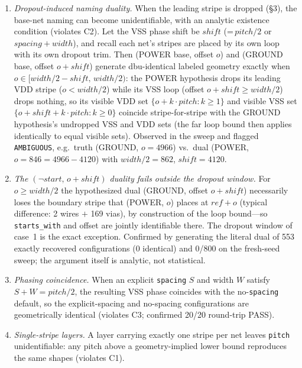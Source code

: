 \documentclass[11pt]{article}
\begin{document}
\begin{enumerate}
\item \emph{Dropout-induced naming duality.} When the leading stripe is
dropped (\S3), the base-net naming can become unidentifiable, with an
analytic existence condition (violates C2).  Let the VSS phase shift be
$\mathit{shift}$ (=\,$\mathit{pitch}/2$ or $\mathit{spacing} +
\mathit{width}$), and recall each net's stripes are placed by its own
loop with its own dropout trim.  Then (POWER base, offset $o$) and
(GROUND base, offset $o + \mathit{shift}$) generate dbu-identical
labeled geometry exactly when $o \in [\mathit{width}/2 -
\mathit{shift},\, \mathit{width}/2)$: the POWER hypothesis drops its
leading VDD stripe ($o < \mathit{width}/2$) while its VSS loop (offset
$o + \mathit{shift} \geq \mathit{width}/2$) drops nothing, so its
visible VDD set $\{o + k\cdot\mathit{pitch} : k \geq 1\}$ and visible
VSS set $\{o + \mathit{shift} + k\cdot\mathit{pitch} : k \geq 0\}$
coincide stripe-for-stripe with the GROUND hypothesis's undropped VSS
and VDD sets (the far loop bound then applies identically to equal
visible sets).  Observed in the sweep and flagged \texttt{AMBIGUOUS},
e.g.\ truth (GROUND, $o{=}4966$) vs.\ dual (POWER, $o{=}846 = 4966 -
4120$) with $\mathit{width}/2{=}862$, $\mathit{shift}{=}4120$.
\item \emph{The $(\neg\mathit{start},\,o+\mathit{shift})$ duality fails
outside the dropout window.} For $o \geq \mathit{width}/2$ the
hypothesized dual (GROUND, offset $o+\mathit{shift}$) necessarily loses
the boundary stripe that (POWER, $o$) places at $\mathit{ref}+o$
(typical difference: 2 wires $+$ 169 vias), by construction of the loop
bound---so \texttt{starts\_with} and offset are jointly identifiable
there.  The dropout window of case~1 is the exact exception.  Confirmed
by generating the literal dual of 553 exactly recovered configurations
(0 identical) and 0/800 on the fresh-seed sweep; the argument itself is
analytic, not statistical.
\item \emph{Phasing coincidence.} When an explicit \texttt{spacing} $S$
and width $W$ satisfy $S + W = \mathit{pitch}/2$, the resulting VSS phase
coincides with the no-\texttt{spacing} default, so the explicit-spacing
and no-spacing configurations are geometrically identical (violates C3;
confirmed 20/20 round-trip PASS).
\item \emph{Single-stripe layers.} A layer carrying exactly one stripe
per net leaves \texttt{pitch} unidentifiable: any pitch above a
geometry-implied lower bound reproduces the same shapes (violates C1).

\end{enumerate}
\end{document}
